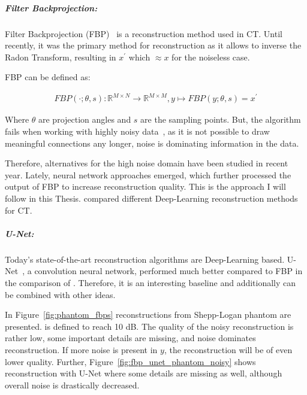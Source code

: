 \subparagraph{Filter Backprojection:}
Filter Backprojection (FBP)~\cite{tomographicReconstruction} is a reconstruction method used in CT.
Until recently, it was the primary method for reconstruction as it allows to inverse the Radon Transform, resulting in 
$x^{\prime}$ which $ \approx x$ for the noiseless case. 

FBP can be defined as:

\begin{equation}
    \label{eq:fbp}
    \begin{aligned}
        \textit{FBP}(\cdot; \theta, s) : \mathbb{R}^{M \times N} \to\mathbb{R}^{M \times M}, y \mapsto \textit{FBP}(y; \theta, s) = x^{\prime}
    \end{aligned}
\end{equation}

Where $\theta$ are projection angles and $s$ are the sampling points.
But, the algorithm fails when working with highly noisy data~\cite{cryoEmMath2}, as it is not possible to draw meaningful
connections any longer, noise
is dominating information in the data.

Therefore, alternatives for the high noise domain have been studied in recent year.
Lately, neural network approaches emerged, which further processed the output of FBP to increase reconstruction quality.
This is the approach I will follow in this Thesis. \citet{ct-reconstruction-comparison} compared different 
Deep-Learning reconstruction methods for CT. 

\subparagraph{U-Net:}
Today's state-of-the-art reconstruction algorithms are Deep-Learning based.
U-Net~\cite{unet-tomography}, a convolution neural network, performed
much better compared to FBP in the comparison of \citet{ct-reconstruction-comparison}.
Therefore, it is an interesting baseline and additionally can be combined with other ideas.

In Figure~\ref{fig:phantom_fbps} reconstructions from Shepp-Logan phantom are presented.
\snry is defined to reach 10 dB.
The quality of the noisy reconstruction is rather low, some important details are missing, and noise dominates reconstruction.
If more noise is present in $y$, the reconstruction will be of even lower quality.
Further, Figure~\ref{fig:fbp_unet_phantom_noisy} 
shows reconstruction with U-Net where some details are missing as well, although overall noise is drastically decreased.


